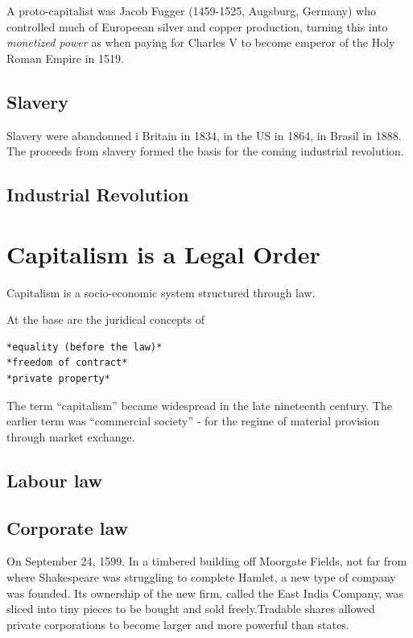 \documentclass[
]{book}
\begin{document}
A proto-capitalist was Jacob Fugger (1459-1525, Augsburg, Germany) who controlled
much of Europeean silver and copper production, turning this into \emph{monetized power}
as when paying for Charles V to become emperor of the Holy Roman Empire in 1519.

\hypertarget{slavery}{%
\section{Slavery}\label{slavery}}

Slavery were abandonned i Britain in 1834, in the US in 1864, in Brasil in 1888.
The proceeds from slavery formed the basis for the coming industrial revolution.

\hypertarget{industrial-revolution}{%
\section{Industrial Revolution}\label{industrial-revolution}}

\hypertarget{capitalism-is-a-legal-order}{%
\chapter{Capitalism is a Legal Order}\label{capitalism-is-a-legal-order}}

Capitalism is a socio-economic system structured through law.

At the base are the juridical concepts of

\begin{verbatim}
*equality (before the law)*
*freedom of contract*
*private property*
\end{verbatim}

The term ``capitalism'' became widespread in the late nineteenth century.
The earlier term was ``commercial society'' - for the regime of
material provision through market exchange.

\hypertarget{labour-law}{%
\section{Labour law}\label{labour-law}}

\hypertarget{corporate-law}{%
\section{Corporate law}\label{corporate-law}}

On September 24, 1599. In a timbered building off Moorgate Fields, not far from where Shakespeare was struggling to complete Hamlet, a new type of company was founded. Its ownership of the new firm, called the East India Company, was sliced into tiny pieces to be bought and sold freely.Tradable shares allowed private corporations to become larger and more powerful than states.
\end{document}
